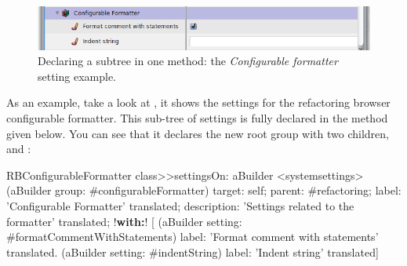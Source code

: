 \documentclass[a4paper,10pt,twoside]{book}
\begin{document}
\begin{figure}[tbh]
\begin{center}
\includegraphics[scale=0.47]{configurableFormatter}
\caption{Declaring a subtree in one method: the \textit{Configurable formatter} setting example.}
\end{center}
\end{figure}


As an example, take a look at , it shows the settings for the refactoring browser configurable formatter. This sub-tree of settings is fully declared in the method  given below. You can see that it declares the new root group  with two children,  and :
\begin{code}{}
RBConfigurableFormatter class>>settingsOn: aBuilder
	<systemsettings>	
	(aBuilder group: #configurableFormatter)
		target: self;
		parent: #refactoring;
		label: 'Configurable Formatter' translated;
		description: 'Settings related to the formatter' translated;
		!\textbf{with:}! [
				(aBuilder setting: #formatCommentWithStatements)
					label: 'Format comment with statements' translated.
				(aBuilder setting: #indentString)
					label: 'Indent string' translated]
\end{code}
\end{document}
